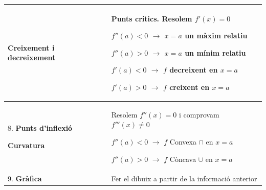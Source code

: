 \begin{center}
\begin{longtable}[!htb]{|p{}|p{}|}
			\textbf{Creixement i decreixement}
			
			& Punts crítics. Resolem $f'(x)=0$
			
			$f''(a)<0$ $\rightarrow$ $x=a$ un màxim relatiu
			
			$f''(a)>0$ $\rightarrow$ $x=a$ un mínim relatiu
			\newline
			
			$f'(a)<0$ $\rightarrow$ $f$ decreixent en $x=a$
			
			$f'(a)>0$ $\rightarrow$ $f$ creixent en $x=a$
			\\  [1.5ex] \hline 
			8. \textbf{Punts d'inflexió}
			\newline
			
			
			\textbf{Curvatura}
			
			& Resolem $f''(x)=0$ i comprovam $f'''(x)\neq 0$
			\newline
			
			$f''(a)<0$ $\rightarrow$ $f$ Convexa $\cap$ en $x=a$
			
			$f''(a)>0$ $\rightarrow$ $f$ Còncava $\cup$ en $x=a$
			\\  [1.5ex] \hline 
			9. \textbf{Gràfica} & Fer el dibuix a partir de la informació anterior \\  [1.5ex] \hline 
		\end{longtable}
	\end{center}





